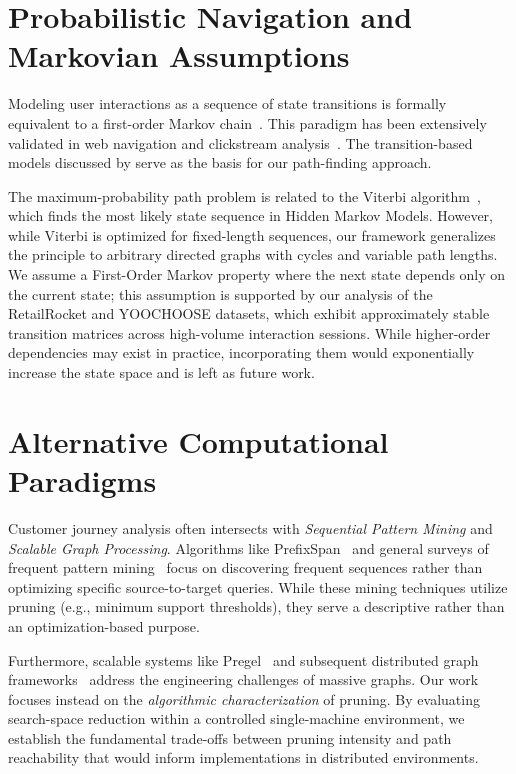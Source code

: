 \section{Probabilistic Navigation and Markovian Assumptions}

Modeling user interactions as a sequence of state transitions is formally equivalent to a first-order Markov chain~\citep{norris1998markov}. This paradigm has been extensively validated in web navigation and clickstream analysis~\citep{bucklin2003clickstream, liu2011webmining}. The transition-based models discussed by \citet{resnick1997recommender} serve as the basis for our path-finding approach.

The maximum-probability path problem is related to the Viterbi algorithm~\citep{viterbi1967error, rabiner1989hmm}, which finds the most likely state sequence in Hidden Markov Models. However, while Viterbi is optimized for fixed-length sequences, our framework generalizes the principle to arbitrary directed graphs with cycles and variable path lengths. We assume a First-Order Markov property where the next state depends only on the current state; this assumption is supported by our analysis of the RetailRocket and YOOCHOOSE datasets, which exhibit approximately stable transition matrices across high-volume interaction sessions. While higher-order dependencies may exist in practice, incorporating them would exponentially increase the state space and is left as future work.

\section{Alternative Computational Paradigms}

Customer journey analysis often intersects with \emph{Sequential Pattern Mining} and \emph{Scalable Graph Processing}. Algorithms like PrefixSpan~\citep{pei2001prefixspan} and general surveys of frequent pattern mining~\citep{han2007sequential} focus on discovering frequent sequences rather than optimizing specific source-to-target queries. While these mining techniques utilize pruning (e.g., minimum support thresholds), they serve a descriptive rather than an optimization-based purpose.

Furthermore, scalable systems like Pregel~\citep{malewicz2010pregel} and subsequent distributed graph frameworks~\citep{sahu2017scaling} address the engineering challenges of massive graphs. Our work focuses instead on the \emph{algorithmic characterization} of pruning. By evaluating search-space reduction within a controlled single-machine environment, we establish the fundamental trade-offs between pruning intensity and path reachability that would inform implementations in distributed environments.

